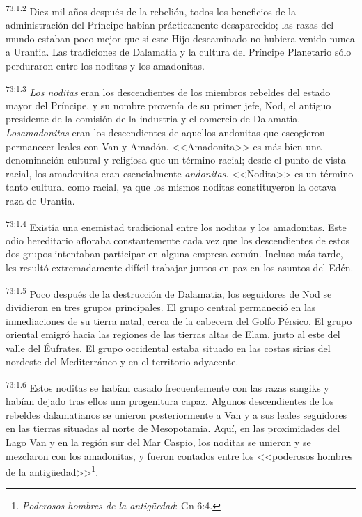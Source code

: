 \par
\textsuperscript{73:1.2} Diez mil años después de la rebelión, todos los beneficios de la administración del Príncipe habían prácticamente desaparecido; las razas del mundo estaban poco mejor que si este Hijo descaminado no hubiera venido nunca a Urantia. Las tradiciones de Dalamatia y la cultura del Príncipe Planetario sólo perduraron entre los noditas y los amadonitas.

\par
\textsuperscript{73:1.3} \textit{Los noditas} eran los descendientes de los miembros rebeldes del estado mayor del Príncipe, y su nombre provenía de su primer jefe, Nod, el antiguo presidente de la comisión de la industria y el comercio de Dalamatia. \textit{Losamadonitas} eran los descendientes de aquellos andonitas que escogieron permanecer leales con Van y Amadón. <<Amadonita>> es más bien una denominación cultural y religiosa que un término racial; desde el punto de vista racial, los amadonitas eran esencialmente \textit{andonitas}. <<Nodita>> es un término tanto cultural como racial, ya que los mismos noditas constituyeron la octava raza de Urantia.

\par
\textsuperscript{73:1.4} Existía una enemistad tradicional entre los noditas y los amadonitas. Este odio hereditario afloraba constantemente cada vez que los descendientes de estos dos grupos intentaban participar en alguna empresa común. Incluso más tarde, les resultó extremadamente difícil trabajar juntos en paz en los asuntos del Edén.

\par
\textsuperscript{73:1.5} Poco después de la destrucción de Dalamatia, los seguidores de Nod se dividieron en tres grupos principales. El grupo central permaneció en las inmediaciones de su tierra natal, cerca de la cabecera del Golfo Pérsico. El grupo oriental emigró hacia las regiones de las tierras altas de Elam, justo al este del valle del Éufrates. El grupo occidental estaba situado en las costas sirias del nordeste del Mediterráneo y en el territorio adyacente.

\par
\textsuperscript{73:1.6} Estos noditas se habían casado frecuentemente con las razas sangiks y habían dejado tras ellos una progenitura capaz. Algunos descendientes de los rebeldes dalamatianos se unieron posteriormente a Van y a sus leales seguidores en las tierras situadas al norte de Mesopotamia. Aquí, en las proximidades del Lago Van y en la región sur del Mar Caspio, los noditas se unieron y se mezclaron con los amadonitas, y fueron contados entre los <<poderosos hombres de la antig\"uedad>>\footnote{\textit{Poderosos hombres de la antig\"uedad}: Gn 6:4.}.


